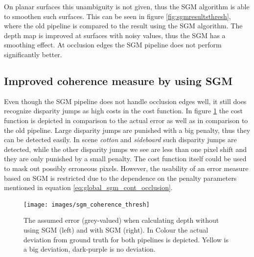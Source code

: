 \documentclass  [
  paper    = a4,
  BCOR     = 10mm,
  twoside,
  fontsize = 12pt,
  fleqn,
  toc      = bibnumbered,
  toc      = listofnumbered,
  numbers  = noendperiod,
  headings = normal,
  listof   = leveldown,
  version  = 3.03
]                                       {scrreprt}
\begin{document}
On planar surfaces this unambiguity is not given, thus the SGM algorithm is able to smoothen such surfaces. This can be seen in figure \ref{fig:sgmresultsthresh}, where the old pipeline is compared to the result using the SGM algorithm. The depth map is improved at surfaces with noisy values, thus the SGM has a smoothing effect. At occlusion edges the SGM pipeline does not perform significantly better. 
\subsection{Improved coherence measure by using SGM}
\label{sec:improved_coh}
Even though the SGM pipeline does not handle occlusion edges well, it still does recognize disparity jumps as high costs in the cost function. In figure \ref{fig:sgmcoherencethresh} the cost function is depicted in comparison to the actual error as well as in comparison to the old pipeline. Large disparity jumps are punished with a big penalty, thus they can be detected easily. In scene \textit{cotton} and \textit{sideboard} such disparity jumps are detected, while the other disparity jumps we see are less than one pixel shift and they are only punished by a small penalty. The cost function itself could be used to mask out possibly erroneous pixels.
However, the usability of an error measure based on SGM is restricted due to the dependence on the penalty parameters mentioned in equation \ref{eq:global_sgm_cont_occlusion}.
\begin{figure}[h!]
	\centering
	\texttt{[image: images/sgm\_coherence\_thresh]}
	\caption[SGM Coherence measure]{The assumed error (grey-valued) when calculating depth without using SGM (left) and with SGM (right). In Colour the actual deviation from ground truth for both pipelines is depicted. Yellow is a big deviation, dark-purple is no deviation.}
	\label{fig:sgmcoherencethresh}
\end{figure}
\end{document}
